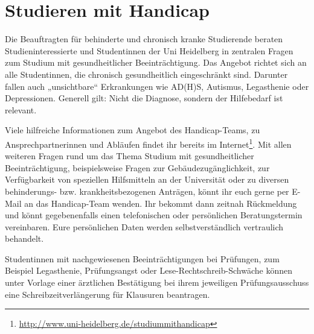 \section{Studieren mit Handicap}
Die Beauftragten für behinderte und chronisch kranke Studierende beraten Studieninteressierte und Studentinnen der Uni Heidelberg in zentralen Fragen zum Studium mit gesundheitlicher Beeinträchtigung.
Das Angebot richtet sich an alle Studentinnen, die chronisch gesundheitlich eingeschränkt sind. Darunter fallen auch „unsichtbare“ Erkrankungen wie AD(H)S, Autismus, Legasthenie oder Depressionen. Generell gilt: Nicht die Diagnose, sondern der Hilfebedarf ist relevant.

Viele hilfreiche Informationen zum Angebot des Handicap-Teams, zu Ansprechpartnerinnen und Abläufen findet ihr bereits im Internet\footnote{\url{http://www.uni-heidelberg.de/studiummithandicap}}. Mit allen weiteren Fragen rund um das Thema Studium mit gesundheitlicher Beeinträchtigung, beispielsweise Fragen zur Gebäudezugänglichkeit,  zur Verfügbarkeit von speziellen Hilfsmitteln an der Universität oder zu diversen behinderungs- bzw. krankheitsbezogenen Anträgen, könnt ihr euch gerne per E-Mail an das Handicap-Team wenden. Ihr bekommt dann zeitnah Rückmeldung und könnt gegebenenfalls einen telefonischen oder persönlichen Beratungstermin vereinbaren.
Eure persönlichen Daten werden selbstverständlich vertraulich behandelt.

Studentinnen mit nachgewiesenen Beeinträchtigungen bei Prüfungen, zum Beispiel Legasthenie, Prüfungsangst oder Lese-Rechtschreib-Schwäche können unter Vorlage einer ärztlichen Bestätigung bei ihrem jeweiligen Prüfungsausschuss eine Schreibzeitverlängerung für Klausuren beantragen.